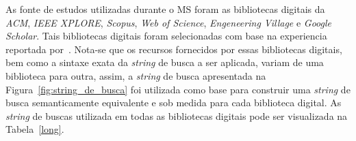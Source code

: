 As fonte de estudos utilizadas durante o MS foram as bibliotecas digitais da \textit{ACM}, 
\textit{IEEE XPLORE}, \textit{Scopus}, \textit{Web of Science}, \textit{Engeneering Village} e \textit{Google Scholar}. Tais bibliotecas digitais foram selecionadas com base na experiencia reportada por~. Nota-se que os recursos fornecidos por essas bibliotecas digitais, bem como a sintaxe exata da \textit{string} de busca a ser aplicada, variam de uma biblioteca para outra, assim, a \textit{string} de busca apresentada na Figura~\ref{fig:string_de_busca} foi utilizada como base para construir uma \textit{string} de busca semanticamente equivalente e sob medida para cada biblioteca digital. As \textit{string} de buscas utilizada em todas as bibliotecas digitais pode ser visualizada na Tabela~\ref{long}.


